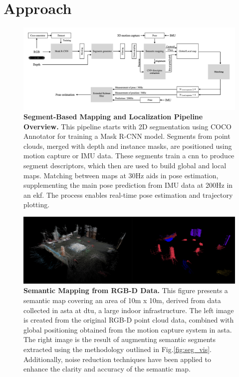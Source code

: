 \chapter{Approach}

\begin{figure}[H]
    \centering
    \includegraphics[width=1.0\textwidth]{Pictures/diagram_whole.png}
    \caption{\textbf{Segment-Based Mapping and Localization Pipeline Overview.} This pipeline starts with 2D segmentation using COCO Annotator\cite{cocoannotator} for training a Mask R-CNN model. Segments from point clouds, merged with depth and instance masks, are positioned using motion capture or IMU data. These segments train a \acrshort{cnn} to produce segment descriptors, which then are used to build global and local maps. Matching between maps at 30Hz aids in pose estimation, supplementing the main pose prediction from IMU data at 200Hz in an \acrshort{ekf}. The process enables real-time pose estimation and trajectory plotting.} 
    \label{fig:big_pic}
\end{figure}

\begin{figure}[H]
    \centering
    \includegraphics[width=1.0\textwidth]{Pictures/global_map_show.png}
    \caption{\textbf{Semantic Mapping from RGB-D Data.} This figure presents a semantic map covering an area of 10m x 10m, derived from data collected in \acrfull{asta} at \acrfull{dtu}, a large indoor infrastructure. The left image is created from the original RGB-D point cloud data, combined with global positioning obtained from the motion capture system in \acrshort{asta}. The right image is the result of augmenting semantic segments extracted using the methodology outlined in Fig.\ref{fig:seg_vis}. Additionally, noise reduction techniques have been applied to enhance the clarity and accuracy of the semantic map.}
    \label{fig:global map}
\end{figure}
